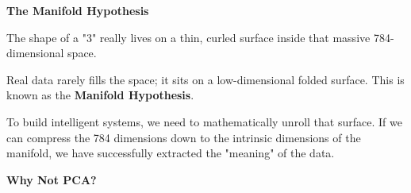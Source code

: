 \documentclass[11pt]{article}
\begin{document}
\begin{center}
{\fontsize{26}{30}\selectfont\color{brandnavy}\bfseries The Manifold Hypothesis}
\end{center}

\vspace{0.3in}

The shape of a "3" really lives on a thin, curled surface inside that massive 784-dimensional space.

\vspace{0.2in}

Real data rarely fills the space; it sits on a low-dimensional folded surface. This is known as the \textbf{Manifold Hypothesis}.

\vspace{0.2in}

To build intelligent systems, we need to mathematically unroll that surface. If we can compress the 784 dimensions down to the intrinsic dimensions of the manifold, we have successfully extracted the "meaning" of the data.

\vspace{0.4in}

\begin{center}
\end{center}

\newpage


\vspace*{0.8in}

\begin{center}
{\fontsize{26}{30}\selectfont\color{brandnavy}\bfseries Why Not PCA?}
\end{center}
\end{document}
